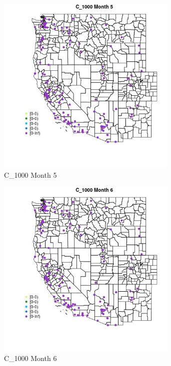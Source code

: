 \begin{figure} 
\centering  
\includegraphics[width=0.77\textwidth]{Code_Outputs/Report_ML_input_PM25_Step4_part_e_de_duplicated_aves_MapObsMo5C_1000.jpg} 
\caption{\label{fig:Report_ML_input_PM25_Step4_part_e_de_duplicated_avesMapObsMo5C_1000}C_1000 Month 5} 
\end{figure} 
 

\begin{figure} 
\centering  
\includegraphics[width=0.77\textwidth]{Code_Outputs/Report_ML_input_PM25_Step4_part_e_de_duplicated_aves_MapObsMo6C_1000.jpg} 
\caption{\label{fig:Report_ML_input_PM25_Step4_part_e_de_duplicated_avesMapObsMo6C_1000}C_1000 Month 6} 
\end{figure} 
 

